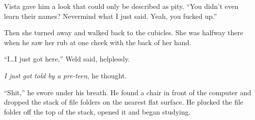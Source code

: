 Vista gave him a look that could only be described as pity.  ``You didn't even learn their names?  Nevermind what I just said.  Yeah, you fucked up.''



Then she turned away and walked back to the cubicles.  She was halfway there when he saw her rub at one cheek with the back of her hand.



``I\ldots I just got here,'' Weld said, helplessly.



\emph{I just got told by a pre-teen}, he thought.



``Shit,'' he swore under his breath.  He found a chair in front of the computer and dropped the stack of file folders on the nearest flat surface.  He plucked the file folder off the top of the stack, opened it and began studying.





